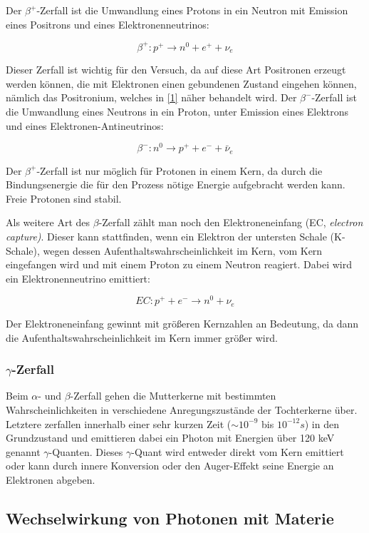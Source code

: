 Der $\beta^+$-Zerfall ist die Umwandlung eines Protons in ein Neutron mit Emission eines Positrons und eines Elektronenneutrinos:

$$ \beta^+: p^+ \rightarrow n^0 + e^+ + \nu_e $$

Dieser Zerfall ist wichtig für den Versuch, da auf diese Art Positronen erzeugt werden können, die mit Elektronen einen gebundenen Zustand eingehen können, nämlich das Positronium, welches in \ref{1} näher behandelt wird.
Der $\beta^-$-Zerfall ist die Umwandlung eines Neutrons in ein Proton, unter Emission eines Elektrons und eines Elektronen-Antineutrinos:

$$ \beta^-: n^0 \rightarrow p^+ + e^- + \bar \nu_e $$

Der $\beta^+$-Zerfall ist nur möglich für Protonen in einem Kern, da durch die Bindungsenergie die für den Prozess nötige Energie aufgebracht werden kann. Freie Protonen sind stabil.

Als weitere Art des $\beta$-Zerfall zählt man noch den Elektroneneinfang (EC, \emph{electron capture)}. Dieser kann stattfinden, wenn ein Elektron der untersten Schale (K-Schale), wegen dessen Aufenthaltswahrscheinlichkeit im Kern, vom Kern eingefangen wird und mit einem Proton zu einem Neutron reagiert. Dabei wird ein Elektronenneutrino emittiert:

$$ EC: p^+ + e^- \rightarrow n^0 + \nu_e $$

Der Elektroneneinfang gewinnt mit größeren Kernzahlen an Bedeutung, da dann die Aufenthaltswahrscheinlichkeit im Kern immer größer wird.

\subsubsection{$\gamma$-Zerfall}

Beim $\alpha$- und $\beta$-Zerfall gehen die Mutterkerne mit bestimmten Wahrscheinlichkeiten in verschiedene Anregungszustände der Tochterkerne über. Letztere zerfallen innerhalb einer sehr kurzen Zeit ($\sim 10^{-9}$ bis $10^{-12} s$) in den Grundzustand und emittieren dabei ein Photon mit Energien über 120 keV genannt $\gamma$-Quanten. Dieses $\gamma$-Quant wird entweder direkt vom Kern emittiert oder kann durch innere Konversion oder den Auger-Effekt seine Energie an Elektronen abgeben.

\subsection{Wechselwirkung von Photonen mit Materie \label{2}}

